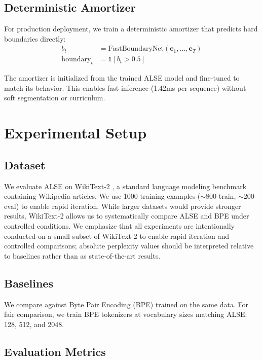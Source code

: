 \documentclass{article}
\begin{document}
\subsection{Deterministic Amortizer}

For production deployment, we train a deterministic amortizer that predicts hard boundaries directly:
\begin{align}
b_t &= \text{FastBoundaryNet}(\mathbf{e}_1, \ldots, \mathbf{e}_T) \\
\text{boundary}_t &= \mathbb{1}[b_t > 0.5]
\end{align}

The amortizer is initialized from the trained ALSE model and fine-tuned to match its behavior. This enables fast inference (1.42ms per sequence) without soft segmentation or curriculum.

\section{Experimental Setup}

\subsection{Dataset}

We evaluate ALSE on WikiText-2 \cite{merity2017wikitext}, a standard language modeling benchmark containing Wikipedia articles. We use 1000 training examples ($\sim$800 train, $\sim$200 eval) to enable rapid iteration. While larger datasets would provide stronger results, WikiText-2 allows us to systematically compare ALSE and BPE under controlled conditions. We emphasize that all experiments are intentionally conducted on a small subset of WikiText-2 to enable rapid iteration and controlled comparisons; absolute perplexity values should be interpreted relative to baselines rather than as state-of-the-art results.

\subsection{Baselines}

We compare against Byte Pair Encoding (BPE) \cite{sennrich2016bpe} trained on the same data. For fair comparison, we train BPE tokenizers at vocabulary sizes matching ALSE: 128, 512, and 2048.

\subsection{Evaluation Metrics}
\end{document}
